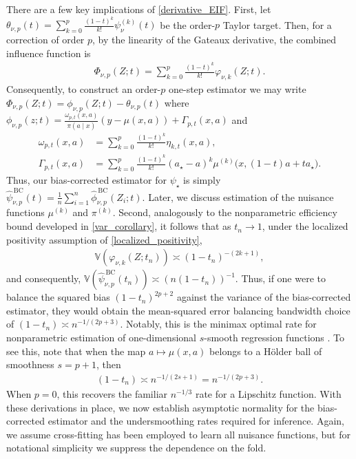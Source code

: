 \documentclass[11pt,twoside]{article}
\theoremstyle{definition}
\theoremstyle{remark}
\begin{document}
There are a few key implications of \cref{derivative_EIF}. First, let $\theta_{\nu,p}(t) = \sum_{k=0}^{p}\frac{(1-t)^k}{k!}\psi_\nu^{(k)}(t)$ be the order-$p$ Taylor target. Then, for a correction of order $p$, by the linearity of the Gateaux derivative, the combined influence function is
\begin{align*}
    \Phi_{\nu, p}(Z; t) = \sum_{k=0}^p \frac{(1-t)^k}{k!} \varphi_{\nu,k}(Z;t).
\end{align*}
Consequently, to construct an order-$p$ one-step estimator we may write $ \Phi_{\nu,p}(Z;t) =\phi_{\nu,p}(Z;t)- \theta_{\nu,p}(t)$ where $\phi_{\nu,p}(z;t) = \frac{\omega_{p,t}(x,a)}{\pi(a\mid x)}(y-\mu(x,a))+\Gamma_{p,t}(x,a)$ and
\begin{align*}
    \omega_{p,t}(x,a) &= \sum_{k=0}^{p}\frac{(1-t)^k}{k!}\eta_{k,t}(x,a), \\
    \Gamma_{p,t}(x,a) &= \sum_{k=0}^{p}\frac{(1-t)^k}{k!}(a_\star-a)^k \mu^{(k)}\! \big(x,(1-t)a + t a_\star\big).
\end{align*}
Thus, our bias-corrected estimator for $\psi_\star$ is simply $  \widehat\psi_{\nu,p}^{\,\mathrm{BC}}(t) =\frac{1}{n}\sum_{i=1}^{n} \widehat{\phi}_{\nu,p}^{\, \mathrm{BC}}(Z_i;t)$. Later, we discuss estimation of the nuisance functions $\mu^{(k)}$ and $\pi^{(k)}$. Second, analogously to the nonparametric efficiency bound developed in \cref{var_corollary}, it follows that as $t_n \to 1$, under the localized positivity assumption of \cref{localized_positivity},
\begin{align*}
    \mathbb{V}(\varphi_{\nu,k}(Z;t_n)) \asymp (1-t_n)^{-(2k+1)},
\end{align*}
and consequently, $\mathbb{V}(\widehat{\psi}_{\nu, p}^{\,\mathrm{BC}}(t_n)) \asymp (n(1 - t_n))^{-1}$. Thus, if one were to balance the squared bias $(1 - t_n)^{2p+2}$ against the variance of the bias-corrected estimator, they would obtain the mean-squared error balancing bandwidth choice of $(1-t_n)\asymp n^{-1/(2p+3)}$. Notably, this is the minimax optimal rate for nonparametric estimation of one-dimensional $s$-smooth regression functions \citep{stone80, stone82}. To see this, note that when the map $a\mapsto\mu(x,a)$ belongs to a H\"older ball of smoothness $s=p+1$, then 
\begin{align*}
    (1 - t_n) \asymp n^{-1/(2s+1)} =n^{-1/(2p+3)}.
\end{align*}
When $p=0$, this recovers the familiar $n^{-1/3}$ rate for a Lipschitz function. With these derivations in place, we now establish asymptotic normality for the bias-corrected estimator and the undersmoothing rates required for inference. Again, we assume cross-fitting has been employed to learn all nuisance functions, but for notational simplicity we suppress the dependence on the fold.
\end{document}

